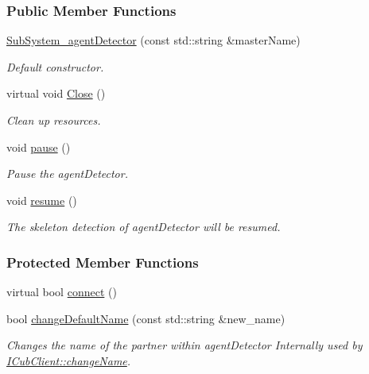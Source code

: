 \subsubsection*{Public Member Functions}
\begin{DoxyCompactItemize}
\item 
\hyperlink{group__icubclient__subsystems_a8f9347c9a72e6e7278bb4e03f74720df}{Sub\+System\+\_\+agent\+Detector} (const std\+::string \&master\+Name)
\begin{DoxyCompactList}\small\item\em Default constructor. \end{DoxyCompactList}\item 
virtual void \hyperlink{group__icubclient__subsystems_ac36d06ae1d94f17a8eb3581664479127}{Close} ()
\begin{DoxyCompactList}\small\item\em Clean up resources. \end{DoxyCompactList}\item 
void \hyperlink{group__icubclient__subsystems_a0327f12c73a1903ed310069b61d577ea}{pause} ()
\begin{DoxyCompactList}\small\item\em Pause the agent\+Detector. \end{DoxyCompactList}\item 
void \hyperlink{group__icubclient__subsystems_a7fec79d5874e55d2d093c858b70b96bd}{resume} ()
\begin{DoxyCompactList}\small\item\em The skeleton detection of agent\+Detector will be resumed. \end{DoxyCompactList}\end{DoxyCompactItemize}
\subsubsection*{Protected Member Functions}
\begin{DoxyCompactItemize}
\item 
virtual bool \hyperlink{group__icubclient__subsystems_aca0db45f7e3522c954de25f61fd76f7f}{connect} ()
\item 
bool \hyperlink{group__icubclient__subsystems_ad8210611c13b45d3b1ec17f18a10bce8}{change\+Default\+Name} (const std\+::string \&new\+\_\+name)
\begin{DoxyCompactList}\small\item\em Changes the name of the partner within agent\+Detector Internally used by \hyperlink{group__icubclient__clients_a860fb1399bafb125c3955110dc17a42e}{I\+Cub\+Client\+::change\+Name}. \end{DoxyCompactList}\end{DoxyCompactItemize}
